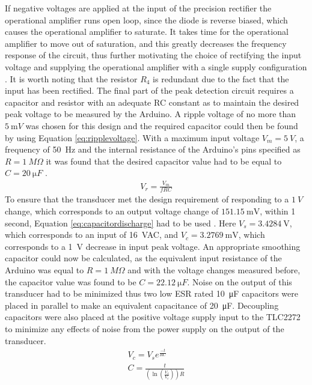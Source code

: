 If negative voltages are applied at the input of the precision rectifier the operational amplifier runs open loop, since the diode is reverse biased, which causes the operational amplifier to saturate. It takes time for the operational amplifier to move out of saturation, and this greatly decreases the frequency response of the circuit, thus further motivating the choice of rectifying the input voltage and supplying the operational amplifier with a single supply configuration \cite{PrecisionRectifierSaturation}. It is worth noting that the resistor $R_4$ is redundant due to the fact that the input has been rectified. \vspace{4mm} \newline
The final part of the peak detection circuit requires a capacitor and resistor with an adequate RC constant as to maintain the desired peak voltage to be measured by the Arduino. A ripple voltage of no more than $\SI{5}{\milli V}$ was chosen for this design and the required capacitor could then be found by using Equation \ref{eq:ripplevoltage}. With a maximum input voltage $V_{m}=\SI{5}{V}$, a frequency of \SI{50}{Hz} and the internal resistance of the Arduino's pins specified as $R=\SI{1}{M\Omega}$ it was found that the desired capacitor value had to be equal to $C=\SI{20}{\micro F}$ \cite{Neaman:2018}.\newline
\begin{align}
  V_{r} = \frac{V_{m}}{fRC} 
   \label{eq:ripplevoltage}
\end{align}
To ensure that the transducer met the design requirement of responding to a $\SI{1}{V}$ change, which corresponds to an output voltage change of $\SI{151.15}{\milli \volt}$, within 1 second, Equation \ref{eq:capacitordischarge} had to be used \cite{CapacitorDischarge}. Here $V_{s}=\SI{3.4284}{\volt}$, which corresponds to an input of \SI{16}{VAC}, and $V_{c}=\SI{3.2769}{\milli \volt}$, which corresponds to a \SI{1}{V} decrease in input peak voltage. An appropriate smoothing capacitor could now be calculated, as the equivalent input resistance of the Arduino was equal to $R=\SI{1}{M \Omega}$ and with the voltage changes measured before, the capacitor value was found to be $C=\SI{22.12}{\micro F}$. Noise on the output of this transducer had to be minimized thus two low ESR rated \SI{10}{\micro F} capacitors were placed in parallel to make an equivalent capacitance of \SI{20}{\micro F}. Decoupling capacitors were also placed at the positive voltage supply input to the TLC2272 to minimize any effects of noise from the power supply on the output of the transducer.
\begin{align}
  V_{c} = V_{s}e^{\frac{-t}{RC}} \nonumber \\
  C = \frac{t}{(\ln(\frac{V_{s}}{V_{c}}))R} \label{eq:capacitordischarge}
\end{align}

